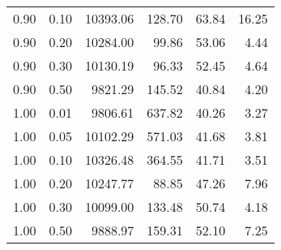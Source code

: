 \begin{table}
\begin{tabular}{rrrrrr}
0.90 & 0.10 & 10393.06 & 128.70 & 63.84 & 16.25 \\
0.90 & 0.20 & 10284.00 & 99.86 & 53.06 & 4.44 \\
0.90 & 0.30 & 10130.19 & 96.33 & 52.45 & 4.64 \\
0.90 & 0.50 & 9821.29 & 145.52 & 40.84 & 4.20 \\
1.00 & 0.01 & 9806.61 & 637.82 & 40.26 & 3.27 \\
1.00 & 0.05 & 10102.29 & 571.03 & 41.68 & 3.81 \\
1.00 & 0.10 & 10326.48 & 364.55 & 41.71 & 3.51 \\
1.00 & 0.20 & 10247.77 & 88.85 & 47.26 & 7.96 \\
1.00 & 0.30 & 10099.00 & 133.48 & 50.74 & 4.18 \\
1.00 & 0.50 & 9888.97 & 159.31 & 52.10 & 7.25 \\
\bottomrule
\end{tabular}
\end{table}

